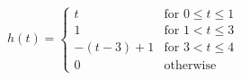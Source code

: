 \documentclass[preview]{standalone}
\begin{document}
\begin{align*}
h(t) = \begin{cases} t & \text{for } 0 \leq t \leq 1 \\ 1 & \text{for } 1 < t \leq 3 \\ -(t-3) + 1 & \text{for } 3 < t \leq 4 \\ 0 & \text{otherwise} \end{cases}
\end{align*}
\end{document}
